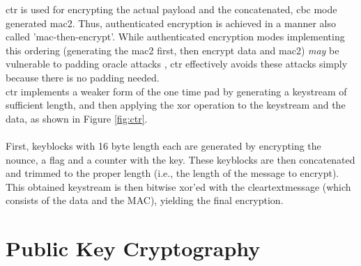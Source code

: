 \gls{ctr} is used for encrypting the actual payload and the concatenated, \gls{cbc} mode generated \gls{mac2}.
Thus, authenticated encryption is achieved in a manner also called 'mac-then-encrypt'. While authenticated
encryption modes implementing this ordering (generating the \gls{mac2} first, then encrypt data and \gls{mac2}) \textit{may}
be vulnerable to padding oracle attacks \cite{eurocryptVaudenay02}, \gls{ctr} effectively avoids these attacks simply because
there is no padding needed.
\\
\gls{ctr} implements a weaker form of the one time pad by generating a keystream of sufficient
length, and then applying the \gls{xor} operation to the keystream and the data, as shown in Figure \ref{fig:ctr}.
\\
\\
First, keyblocks with 16 byte length each are generated by encrypting the nounce, a flag and a counter with the key. These 
keyblocks are then concatenated and trimmed to the proper length (i.e., the length of the message to encrypt). This obtained keystream
is then bitwise \gls{xor}'ed with the cleartextmessage (which consists of the data and the MAC), yielding the final encryption.


\section{Public Key Cryptography}\label{pkc}

